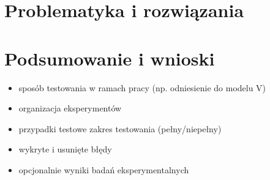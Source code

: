 \documentclass[a4paper,twoside,12pt]{book}
\begin{document}
\chapter{Problematyka i rozwiązania}
\label{ch:06}
\chapter{Podsumowanie i wnioski}
\label{ch:07}
\begin{itemize}
\item sposób testowania w ramach pracy (np. odniesienie do modelu V)
\item organizacja eksperymentów
\item przypadki testowe zakres testowania (pełny/niepełny)
\item wykryte i usunięte błędy
\item opcjonalnie wyniki badań eksperymentalnych
\end{itemize}
\end{document}
